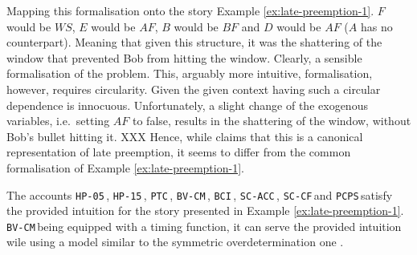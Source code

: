 \documentclass[11pt,a4paper]{book}
\theoremstyle{definition}
\theoremstyle{definition}
\theoremstyle{definition}
\theoremstyle{remark}
\newcommand{\hpu}{\texttt{HP-05}\,}
\newcommand{\ptc}{\texttt{PTC}\,}
\newcommand{\hpm}{\texttt{HP-15}\,}
\newcommand{\bvcm}{\texttt{BV-CM}\,}
\newcommand{\bci}{\texttt{BCI}\,}
\newcommand{\scacc}{\texttt{SC-ACC}\,}
\newcommand{\pcps}{\texttt{PCPS}\,}
\newcommand{\sccf}{\texttt{SC-CF}\,}
\begin{document}
\begin{center}
\end{center}

Mapping this formalisation onto the story Example \ref{ex:late-preemption-1}. $F$ would be $WS$, $E$ would be $AF$, $B$ would be $BF$ and $D$ would be $AF$ ($A$ has no counterpart).
Meaning that given this structure, it was the shattering of the window that prevented Bob from hitting the window. Clearly, a sensible formalisation of the problem.
This, arguably more intuitive, formalisation, however, requires circularity. Given the given context having such a circular dependence is innocuous. Unfortunately, a slight 
change of the exogenous variables, i.e.\ setting $AF$ to false, results in the shattering of the window, without Bob's bullet hitting it. XXX
Hence, while \parencite{baumgartner2013regularity} claims that this is a canonical representation of late preemption, it seems to differ from the common formalisation of Example \ref{ex:late-preemption-1}.


The accounts \hpu, \hpm, \ptc, \bvcm, \bci, \scacc, \sccf and \pcps satisfy the provided intuition for the story presented in Example \ref{ex:late-preemption-1}. \parencite[p.~33]{beckers2018principled,bochman2018actual,denecker2018causal,weslake2015partial,khannecessary,halpern2016actual}
\bvcm being equipped with a timing function, it can serve the provided intuition wile using a model similar to the symmetric overdetermination one \parencite{beckers2018principled}.
\end{document}
